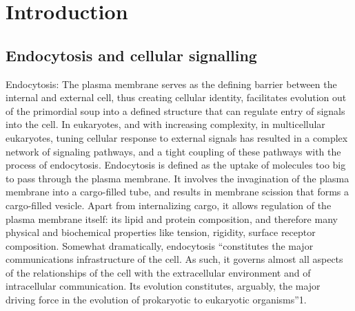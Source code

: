 \chapter{Introduction} %

\label{Ch:Aims} %


\section{Endocytosis and cellular signalling}
Endocytosis:
The plasma membrane serves as the defining barrier between the internal and external cell, thus creating cellular identity, facilitates evolution out of the primordial soup into a defined structure that can regulate entry of signals into the cell. In eukaryotes, and with increasing complexity, in multicellular eukaryotes, tuning cellular response to external signals has resulted in a complex network of signaling pathways, and a tight coupling of these pathways with the process of endocytosis. Endocytosis is defined as the uptake of molecules too big to pass through the plasma membrane. It involves the invagination of the plasma membrane into a cargo-filled tube, and results in membrane scission that forms a cargo-filled vesicle. Apart from internalizing cargo, it allows regulation of the plasma membrane itself: its lipid and protein composition, and therefore many physical and biochemical properties like tension, rigidity, surface receptor composition. Somewhat dramatically, endocytosis “constitutes the major communications infrastructure of the cell. As such, it governs almost all aspects of the relationships of the cell with the extracellular environment and of intracellular communication. Its evolution constitutes, arguably, the major driving force in the evolution of prokaryotic to eukaryotic organisms”1.



